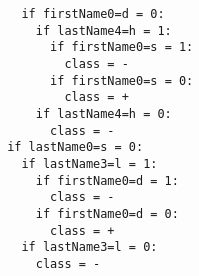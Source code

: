 \begin{verbatim}
                            if firstName0=d = 0:
                              if lastName4=h = 1:
                                if firstName0=s = 1: 
                                  class = -
                                if firstName0=s = 0: 
                                  class = +
                              if lastName4=h = 0: 
                                class = -
                          if lastName0=s = 0:
                            if lastName3=l = 1:
                              if firstName0=d = 1: 
                                class = -
                              if firstName0=d = 0: 
                                class = +
                            if lastName3=l = 0: 
                              class = - 
\end{verbatim}